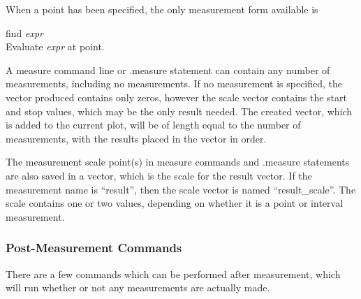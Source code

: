 When a point has been specified, the only measurement form
available is

\begin{description}
\item{{\vt find} {\it expr}}\\
Evaluate {\it expr} at point.
\end{description}

A {\cb measure} command line or {\vt .measure} statement can contain
any number of measurements, including no measurements.  If no
measurement is specified, the vector produced contains only zeros,
however the scale vector contains the start and stop values, which may
be the only result needed.  The created vector, which is added to the
current plot, will be of length equal to the number of measurements,
with the results placed in the vector in order.

The measurement scale point(s) in {\cb measure} commands and {\vt
.measure} statements are also saved in a vector, which is the scale
for the result vector.  If the measurement name is ``{\vt result}'',
then the scale vector is named ``{\vt result\_scale}''.  The scale
contains one or two values, depending on whether it is a point or
interval measurement.

\subsubsection{Post-Measurement Commands}

There are a few commands which can be performed after measurement,
which will run whether or not any measurements are actually made.

